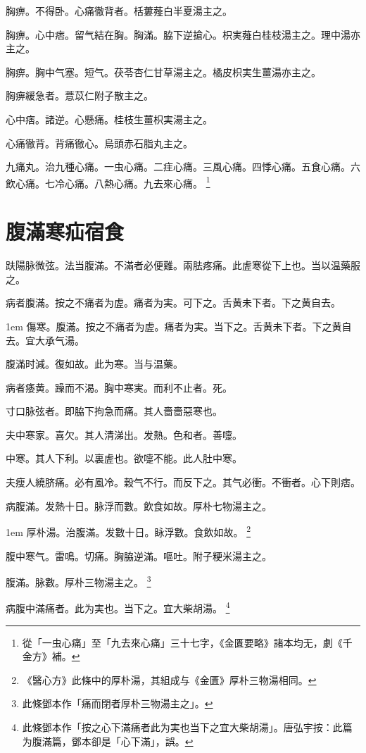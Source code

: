 胸痹。不得卧。心痛徹背者。栝蔞薤白半夏湯主之。

胸痹。心中痞。留气結在胸。胸滿。脇下逆搶心。枳実薤白桂枝湯主之。理中湯亦主之。

胸痹。胸中气塞。短气。茯苓杏仁甘草湯主之。橘皮枳実生薑湯亦主之。

胸痹緩急者。薏苡仁附子散主之。

心中痞。諸逆。心懸痛。桂枝生薑枳実湯主之。

心痛徹背。背痛徹心。烏頭赤石脂丸主之。

九痛丸。治九種心痛。{\khaai 一虫心痛。二疰心痛。三風心痛。四悸心痛。五食心痛。六飲心痛。七冷心痛。八熱心痛。九去來心痛。}
	\footnote{
		從「一虫心痛」至「九去來心痛」三十七字，《金匱要略》諸本均无，劇《千金方》補。
	}

\chapter{腹滿寒疝宿食}

趺陽脉微弦。法当腹滿。不滿者必便難。兩胠疼痛。此虗寒從下上也。当以温藥服之。

病者腹滿。按之不痛{\khaai 者}为虗。痛者为実。可下之。舌黄未下者。下之黄自去。

\hangindent 1em
傷寒。腹滿。按之不痛者为虗。痛者为実。当下之。舌黄未下者。下之黄自去。宜大承气湯。{\yuhan}

腹滿时減。復如故。此为寒。当与温藥。

病者痿黄。躁而不渴。胸中寒実。而利不止者。死。

寸口脉弦者。即脇下拘急而痛。其人嗇嗇惡寒也。

夫中寒家。喜欠。其人清涕出。发熱。色和者。善嚏。

中寒。其人下利。以裏虗也。欲嚏不能。此人肚中寒。

夫瘦人繞脐痛。必有風冷。穀气不行。而反下之。其气必衝。不衝者。心下則痞。

病腹滿。发熱十日。脉浮而數。飲食如故。厚朴七物湯主之。


\hangindent 1em
厚朴湯。治腹滿。发數十日。眿浮數。食飲如故。{\yixin}
	\footnote{
		《醫心方》此條中的厚朴湯，其組成与《金匱》厚朴三物湯相同。
	}

腹中寒气。雷鳴。切痛。胸脇逆滿。嘔吐。附子粳米湯主之。

腹滿。脉數。厚朴三物湯主之。
	\footnote{
		此條鄧本作「痛而閉者厚朴三物湯主之」。
	}

病腹中滿痛者。此为実也。当下之。宜大柴胡湯。
	\footnote{
		此條鄧本作「按之心下滿痛者此为実也当下之宜大柴胡湯」。唐弘宇按：此篇为腹滿篇，鄧本卻是「心下滿」，誤。
	}

